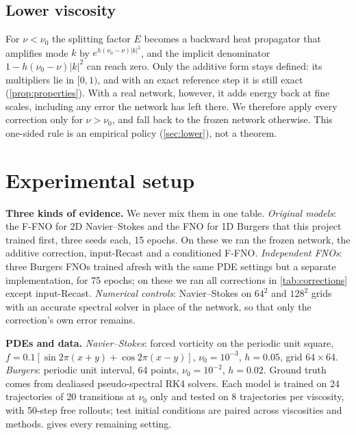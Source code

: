 \documentclass{article}
\theoremstyle{plain}
\newcommand{\add}{additive correction\xspace}
\begin{document}
\subsection{Lower viscosity}
\label{sec:lower-theory}

For $\nu<\nu_0$ the splitting factor $E$ becomes a backward heat propagator that amplifies mode $k$ by $e^{h(\nu_0-\nu)|k|^2}$, and the implicit denominator $1-h(\nu_0-\nu)|k|^2$ can reach zero.
Only the additive form stays defined: its multipliers lie in $[0,1)$, and with an exact reference step it is still exact (\cref{prop:properties}).
With a real network, however, it adds energy back at fine scales, including any error the network has left there.
We therefore apply every correction only for $\nu>\nu_0$, and fall back to the frozen network otherwise.
This one-sided rule is an empirical policy (\cref{sec:lower}), not a theorem.

\section{Experimental setup}
\label{sec:setup}

\textbf{Three kinds of evidence.}
We never mix them in one table.
\emph{Original models}: the F-FNO \citep{tran2023ffno} for 2D Navier--Stokes and the FNO \citep{li2021fno} for 1D Burgers that this project trained first, three seeds each, 15 epochs. On these we ran the frozen network, the \add, input-Recast and a conditioned F-FNO.
\emph{Independent FNOs}: three Burgers FNOs trained afresh with the same PDE settings but a separate implementation, for 75 epochs; on these we ran all corrections in \cref{tab:corrections} except input-Recast.
\emph{Numerical controls}: Navier--Stokes on $64^2$ and $128^2$ grids with an accurate spectral solver in place of the network, so that only the correction's own error remains.

\textbf{PDEs and data.}
\emph{Navier--Stokes}: forced vorticity on the periodic unit square, $f=0.1[\sin 2\pi(x{+}y)+\cos 2\pi(x{-}y)]$, $\nu_0=10^{-3}$, $h=0.05$, grid $64\times64$.
\emph{Burgers}: periodic unit interval, 64 points, $\nu_0=10^{-2}$, $h=0.02$.
Ground truth comes from dealiased pseudo-spectral RK4 solvers.
Each model is trained on 24 trajectories of 20 transitions at $\nu_0$ only and tested on 8 trajectories per viscosity, with 50-step free rollouts; test initial conditions are paired across viscosities and methods.
 gives every remaining setting.
\end{document}
